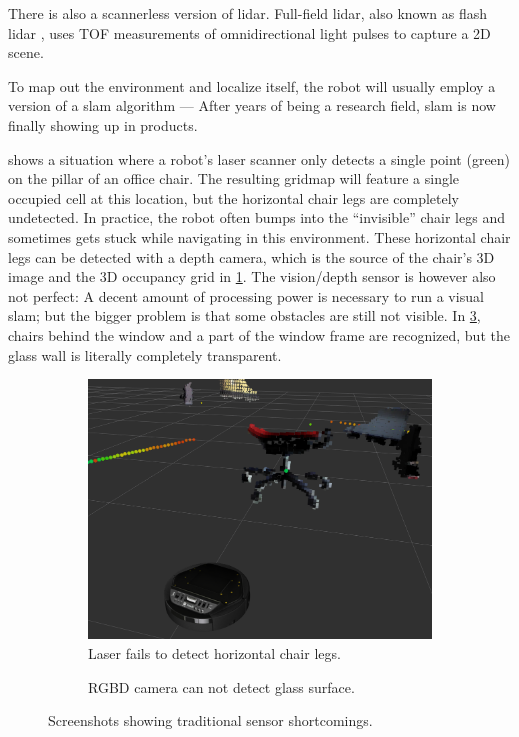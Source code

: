 There is also a scannerless version of lidar. Full-field lidar, also
known as flash lidar \cite{Payne2008}, uses TOF measurements of
omnidirectional light pulses to capture a 2D scene.

To map out the environment and localize itself, the robot will usually
employ a version of a slam algorithm \cite{Cadena2016} --- After years of being a research field, slam is now finally showing up in products.

 shows a situation where a robot's laser scanner only detects a single point (green) on the pillar of an office chair. The resulting gridmap will feature a single occupied cell at this location, but the horizontal chair legs are completely undetected. In practice, the robot often bumps into the ``invisible'' chair legs and sometimes gets stuck while navigating in this environment. These horizontal chair legs can be detected with a depth camera, which is the source of the chair's 3D image and the 3D occupancy grid in \cref{fig:lidar_rgbd}. The vision/depth sensor is however also not perfect: A decent amount of processing power is necessary to run a visual slam; but the bigger problem is that some obstacles are still not visible. In \cref{fig:rgbd_glasswall}, chairs behind the window and a part of the window frame are recognized, but the glass wall is literally completely transparent.

\begin{figure}
    \begin{subfigure}[t]{.485\textwidth}
        \centering
        \includegraphics[max width=\textwidth]{gfx/screenshots/chair_laser_vs_rgbd}
        \caption{Laser fails to detect horizontal chair legs.}
        \label{fig:lidar_rgbd}
    \end{subfigure}%
    \hfill%
    \begin{subfigure}[t]{.485\textwidth}
        \centering
        \def\svgwidth{\linewidth}
        
        \caption{RGBD camera can not detect glass surface.}
        \label{fig:rgbd_glasswall}
    \end{subfigure}%
    \caption{Screenshots showing traditional sensor shortcomings.}
\end{figure}

